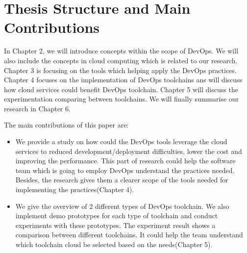 \section{Thesis Structure and Main Contributions}
In Chapter 2, we will introduce concepts within the scope of DevOps. We will also include the concepts in cloud computing which is related to our research. Chapter 3 is focusing on the tools which helping apply the DevOps practices. Chapter 4 focuses on the implementation of DevOps toolchains ans will discuss how cloud services could benefit DevOps toolchain. Chapter 5 will discuss the experimentation comparing between toolchains. We will finally summarise our research in Chapter 6.
\par
The main contributions of this paper are:
\begin{itemize}
    \item We provide a study on how could the DevOps tools leverage the cloud services to reduced development/deployment difficulties, lower the cost and improving the performance. This part of research could help the software team which is going to employ DevOps understand the practices needed. Besides, the research gives them a clearer scope of the tools needed for implementing the practices(Chapter 4).
    \item We give the overview of 2 different types of DevOps toolchain. We also implement demo prototypes for each type of toolchain and conduct experiments with these prototypes. The experiment result shows a comparison between different toolchains. It could help the team understand which toolchain cloud be selected based on the needs(Chapter 5).
\end{itemize}